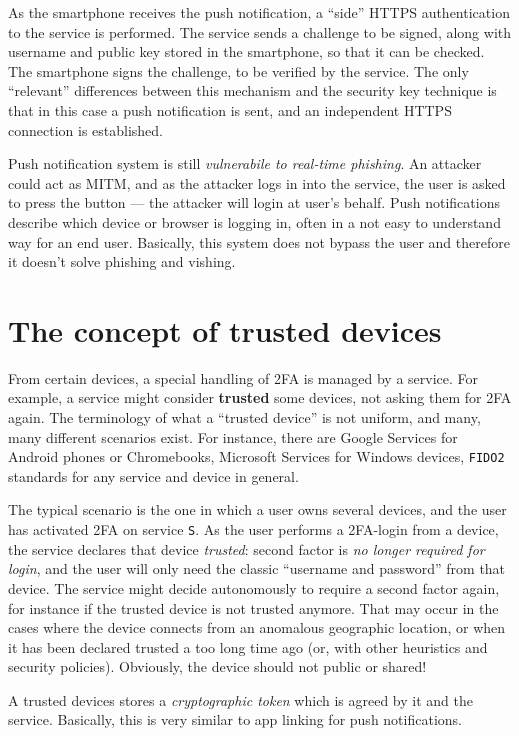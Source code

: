 \documentclass[10pt]{extreport}
\begin{document}
As the smartphone receives the push notification, a ``side'' HTTPS
authentication to the service is performed. The service sends a challenge to be
signed, along with username and public key stored in the smartphone, so that it
can be checked. The smartphone signs the challenge, to be verified by the
service. The only ``relevant'' differences between this mechanism and the
security key technique is that in this case a push notification is sent, and an
independent HTTPS connection is established.

Push notification system is still \emph{vulnerabile to real\--time phishing}.
An attacker could act as MITM, and as the attacker logs in into the service,
the user is asked to press the button --- the attacker will login at user's
behalf. Push notifications describe which device or browser is logging in,
often in a not easy to understand way for an end user. Basically, this system
does not bypass the user and therefore it doesn't solve phishing and vishing.

\section{The concept of trusted devices}

From certain devices, a special handling of 2FA is managed by a service. For
example, a service might consider \textbf{trusted} some devices, not asking
them for 2FA again. The terminology of what a ``trusted device'' is not
uniform, and many, many different scenarios exist. For instance, there are
Google Services for Android phones or Chromebooks, Microsoft Services for
Windows devices, \texttt{FIDO2} standards for any service and device in
general.

The typical scenario is the one in which a user owns several devices, and the
user has activated 2FA on service \texttt{S}. As the user performs a
2FA\--login from a device, the service declares that device \emph{trusted}:
second factor is \emph{no longer required for login}, and the user will only
need the classic ``username and password'' from that device. The service might
decide autonomously to require a second factor again, for instance if the
trusted device is not trusted anymore. That may occur in the cases where the
device connects from an anomalous geographic location, or when it has been
declared trusted a too long time ago (or, with other heuristics and security
policies). Obviously, the device should not public or shared!

A trusted devices stores a \emph{cryptographic token} which is agreed by it and
the service. Basically, this is very similar to app linking for push
notifications.
\end{document}

